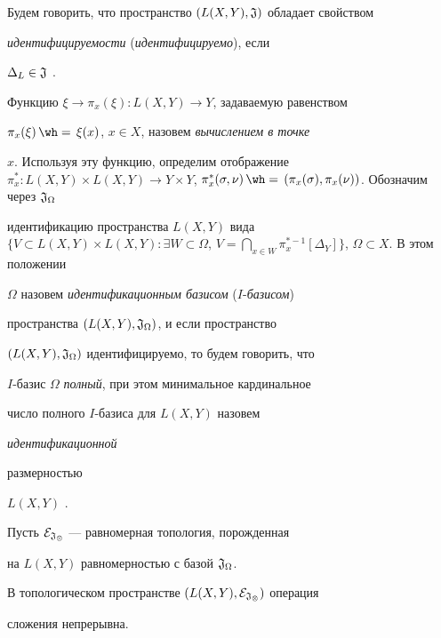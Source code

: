  


Будем говорить, что пространство $(L(X,Y),\frak J)$ обладает свойством 


{\it идентифицируемости} ({\it идентифицируемо}), если 


$\Delta_L\in\frak J$ \cite{1}. 


 


Функцию $\xi\to\pi_x(\xi):L(X,Y)\to Y$, задаваемую равенством 


$\pi_x(\xi)\hateq\xi(x)$, $x\in X$, назовем {\it вычислением в точке} 


$x$. Используя эту функцию, определим отображение $\pi^*_x:L(X,Y)\times 


L(X,Y)\to Y\times Y$, $\pi^*_x(\sigma,\nu)\hateq 


(\pi_x(\sigma),\pi_x(\nu))$. Обозначим через $\frak J_\Omega$ 


идентификацию пространства $L(X,Y)$ вида $\{V\subset L(X,Y)\times 


L(X,Y):\exists W\subset \Omega$, $V=\bigcap\limits_{x\in 


W}\pi^{*-1}_x[\Delta_Y]\}$, $\Omega\subset X$. В этом положении 


$\Omega$ назовем {\it идентификационным базисом} ($I$-{\it базисом}) 


пространства $(L(X,Y),\frak J_\Omega)$, и если пространство 


$(L(X,Y),\frak J_\Omega)$ идентифицируемо, то будем говорить, что 


$I$-базис $\Omega$ {\it полный}, при этом минимальное кардинальное 


число полного $I$-базиса для $L(X,Y)$ назовем {\it идентификационной 


размерностью} $L(X,Y)$ \cite{1}. 


 


Пусть $\cal E_{\frak J_\Omega}$ --- равномерная топология, порожденная 


на $L(X,Y)$ равномерностью с базой $\frak J_\Omega$. 


 


\begin{lem} 


В топологическом пространстве $(L(X,Y),\cal E_{\frak J_\Omega})$ операция 


сложения непрерывна. 


\end{lem} 


